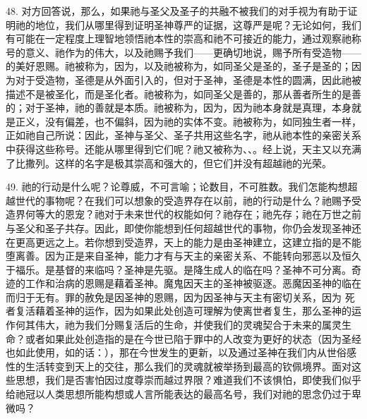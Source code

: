 48. 对方回答说，那么，如果祂与圣父及圣子的共融不被我们的对手视为有助于证明祂的地位，我们从哪里得到证明圣神尊严的证据，这尊严是呢？无论如何，我们有可能在一定程度上理智地领悟祂本性的崇高和祂不可接近的能力，通过观察祂称号的意义、祂作为的伟大，以及祂赐予我们——更确切地说，赐予所有受造物——的美好恩赐。祂被称为，因为，以及祂被称为，如同圣父是圣的，圣子是圣的；因为对于受造物，圣德是从外面引入的，但对于圣神，圣德是本性的圆满，因此祂被描述不是被圣化，而是圣化者。祂被称为，如同圣父是善的，那从善者所生的是善的；对于圣神，祂的善就是本质。祂被称为，因为，因为祂本身就是真理，本身就是正义，没有偏差，也不偏斜，因为祂的实体不变。祂被称为，如同独生者一样，正如祂自己所说：因此，圣神与圣父、圣子共用这些名字，祂从祂本性的亲密关系中获得这些称号。还能从哪里得到它们呢？祂又被称为、、。经上说，天主又以充满了比撒列。这样的名字是极其崇高和强大的，但它们并没有超越祂的光荣。\par

49. 祂的行动是什么呢？论尊威，不可言喻；论数目，不可胜数。我们怎能构想超越世代的事物呢？在我们可以想象的受造界存在以前，祂的行动是什么？祂赐予受造界何等大的恩宠？祂对于未来世代的权能如何？祂存在；祂先存；祂在万世之前与圣父和圣子共存。因此，即使你能想到任何超越世代的事物，你仍会发现圣神还在更高更远之上。若你想到受造界，天上的能力是由圣神建立，这建立指的是不能堕离善。因为正是来自圣神，能力才有与天主的亲密关系、不能转向邪恶以及恒久于福乐。是基督的来临吗？圣神是先驱。是降生成人的临在吗？圣神不可分离。奇迹的工作和治病的恩赐是藉着圣神。魔鬼因天主的圣神被驱逐。恶魔因圣神的临在而归于无有。罪的赦免是因圣神的恩赐，因为因圣神与天主有密切关系，因为 死者复活藉着圣神的运作，因为如果此处创造可理解为使离世者复生，那么圣神的运作何其伟大，祂为我们分赐复活后的生命，并使我们的灵魂契合于未来的属灵生命？或者如果此处创造指的是在今世已陷于罪中的人改变为更好的状态（因为圣经也如此使用，如的话：），那在今世发生的更新，以及通过圣神在我们内从世俗感性的生活转变到天上的交往，那么我们的灵魂就被举扬到最高的钦佩境界。面对这些思想，我们是否害怕因过度尊崇而越过界限？难道我们不该惧怕，即使我们似乎给祂冠以人类思想所能构想或人言所能表达的最高名号，我们对祂的思念仍过于卑微吗？\par

